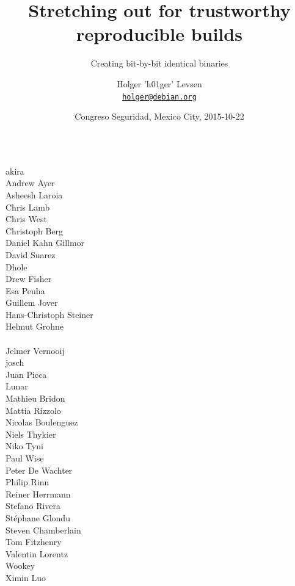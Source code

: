 \documentclass[14pt]{beamer}
\title[Reproducible builds]{Stretching out for trustworthy reproducible builds}
\subtitle{Creating bit-by-bit identical binaries}
\author[Reproducible builds team]{%
   \texorpdfstring{
        Holger 'h01ger' Levsen\\
        \href{mailto:holger@debian.org}{\texttt{holger@debian.org}}
   }{Reproducible builds team}}
\institute[UNAM Mexico City]{}
\date[congresoseguridad]{%
 Congreso Seguridad, Mexico City,
 \small
 2015-10-22}
\begin{document}
\begin{frame}
 \titlepage
\end{frame}

\begin{frame}
 \begin{center}
  \begin{columns}
   \small
    {akira} \\
    {Andrew Ayer} \\
    {Asheesh Laroia} \\
    {Chris Lamb} \\
    Chris West \\
    {Christoph Berg} \\
    {Daniel Kahn Gillmor} \\
    David Suarez \\
    {Dhole} \\
    Drew Fisher \\
    Esa Peuha \\
    {Guillem Jover} \\
    Hans-Christoph Steiner \\
    {Helmut Grohne} \\
     \\
    Jelmer Vernooij \\
    {josch} \\
    Juan Picca \\
    {Lunar} \\
    Mathieu Bridon \\
    {Mattia Rizzolo} \\
    Nicolas Boulenguez \\
    {Niels Thykier} \\
    Niko Tyni \\
    {Paul Wise} \\
    Peter De Wachter \\
    Philip Rinn \\
    {Reiner Herrmann} \\
    {Stefano Rivera} \\
    {Stéphane Glondu} \\
    {Steven Chamberlain} \\
    Tom Fitzhenry \\
    Valentin Lorentz \\
    {Wookey} \\
    {Ximin Luo} \\
  \end{columns}
 \end{center}
\end{frame}
\end{document}
